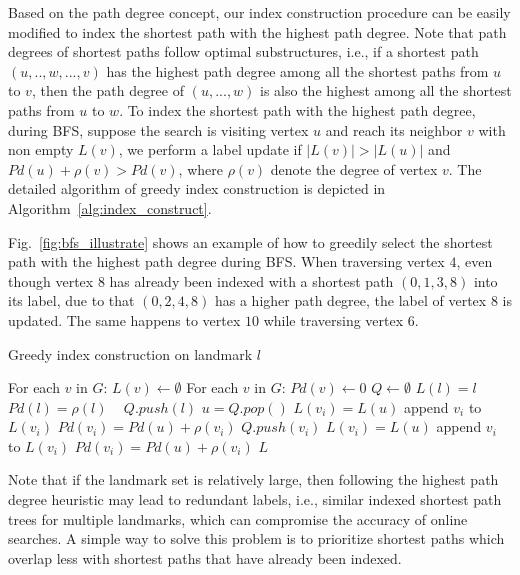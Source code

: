 Based on the path degree concept, our index construction procedure can be easily modified to index the shortest path with the highest path degree. Note that path degrees of shortest paths follow optimal substructures, i.e., if a shortest path $(u, .., w, ..., v)$ has the highest path degree among all the shortest paths from $u$ to $v$, then the path degree of $(u, ..., w)$ is also the highest among all the shortest paths from $u$ to $w$. To index the shortest path with the highest path degree, during BFS, suppose the search is visiting vertex $u$ and reach its neighbor $v$ with non empty $L(v)$, we perform a label update if $|L(v)| > |L(u)|$ and $Pd(u) + \rho(v) > Pd(v)$, where $\rho(v)$ denote the degree of vertex $v$. The detailed algorithm of greedy index construction is depicted in Algorithm~\ref{alg:index_construct}. 

Fig.~\ref{fig:bfs_illustrate} shows an example of how to greedily select the shortest path with the highest path degree during BFS. When traversing vertex $4$, even though vertex $8$ has already been indexed with a shortest path $(0, 1, 3, 8)$ into its label, due to that $(0, 2, 4, 8)$ has a higher path degree, the label of vertex $8$ is updated. The same happens to vertex $10$ while traversing vertex $6$. 

\begin{algorithm}[h]
    \caption{Greedy index construction on landmark $l$}
		\label{alg:index_construct}
    \begin{algorithmic}
						\State For each $v$ in $G$: $L(v) \gets \emptyset$
						\State For each $v$ in $G$: $Pd(v) \gets 0$
						\State $Q \gets \emptyset$
						\State $L(l) = l$
						\State $Pd(l) = \rho(l)$ \
						\State $Q.push(l)$
								\State $u = Q.pop()$
												\State $L(v_i) = L(u)$
												\State append $v_i$ to $L(v_i)$
												\State $Pd(v_i) = Pd(u) + \rho(v_i)$
												\State $Q.push(v_i)$
												\State $L(v_i) = L(u)$
												\State append $v_i$ to $L(v_i)$
												\State $Pd(v_i) = Pd(u) + \rho(v_i)$
										\EndIf
								\EndFor
						\EndWhile
						\State \Return $L$
        \EndFunction
    \end{algorithmic}
\end{algorithm}

Note that if the landmark set is relatively large, then following the highest path degree heuristic may lead to redundant labels, i.e., similar indexed shortest path trees for multiple landmarks, which can compromise the accuracy of online searches. A simple way to solve this problem is to prioritize shortest paths which overlap less with shortest paths that have already been indexed.